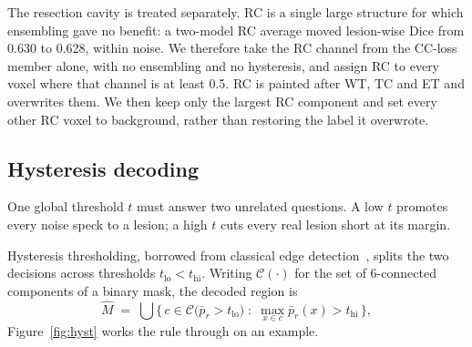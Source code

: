 \documentclass[runningheads]{llncs}
\begin{document}
The resection cavity is treated separately. RC is a single large structure for which ensembling
gave no benefit: a two-model RC average moved lesion-wise Dice from 0.630 to 0.628, within noise.
We therefore take the RC channel from the CC-loss member alone, with no ensembling and no
hysteresis, and assign RC to every voxel where that channel is at least 0.5. RC is painted after
WT, TC and ET and overwrites them. We then keep only the largest RC component and set every other
RC voxel to background, rather than restoring the label it overwrote.

\subsection{Hysteresis decoding}
\label{sec:hysteresis}

One global threshold $t$ must answer two unrelated questions. A low $t$ promotes every noise
speck to a lesion; a high $t$ cuts every real lesion short at its margin.

Hysteresis thresholding, borrowed from classical edge detection~\cite{canny1986}, splits the two
decisions across thresholds $t_{\mathrm{lo}} < t_{\mathrm{hi}}$. Writing $\mathcal{C}(\cdot)$ for the set of 6-connected
components of a binary mask, the decoded region is
\[
\hat{M} \;=\; \bigcup \Big\{\, c \in \mathcal{C}\big(\bar{p}_r > t_{\mathrm{lo}}\big) \;:\;
\max_{x \in c} \bar{p}_r(x) > t_{\mathrm{hi}} \,\Big\},
\]
Figure~\ref{fig:hyst} works the rule through on an example.
\end{document}
